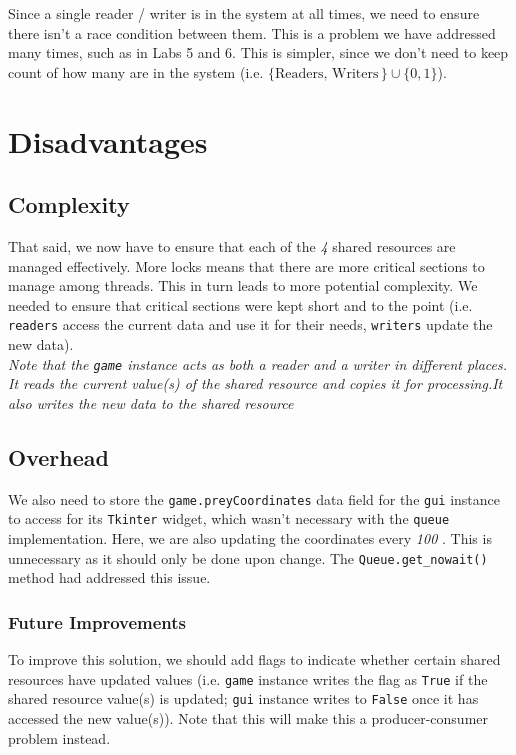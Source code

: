 \documentclass{article}
\begin{document}
Since a single reader / writer is in the system at all times, we need to ensure there isn't a race condition between them. This is a problem we have addressed many times, such as in
Labs 5 and 6. This is simpler, since we don't need to keep count of how many are in the system (i.e. \( \{ \text{Readers, Writers}\, \} \cup \{ 0, 1 \} \)).

\section{Disadvantages}

\subsection{Complexity}

That said, we now have to ensure that each of the \textit{4} shared resources are managed effectively. More locks means that there are more critical sections to manage among threads.
This in turn leads to more potential complexity. We needed to ensure that critical sections were kept short and to the point
(i.e. \texttt{readers} access the current data and use it for their needs, \texttt{writers} update the new data). \\

\textit{Note that the \texttt{game} instance acts as both a reader and a writer in different places. It reads the current value(s) of the shared resource and copies it for processing.It also writes the new data to the shared resource} \\

\subsection{Overhead}

We also need to store the \texttt{game.preyCoordinates} data field for the \texttt{gui} instance to access for its \texttt{Tkinter} widget, which wasn't necessary with the \texttt{queue} implementation.
Here, we are also updating the coordinates every \textit{100\,\,}. This is unnecessary as it should only be done upon change. The \texttt{Queue.get\_nowait()} method had addressed this issue.

\subsubsection{Future Improvements}

To improve this solution, we should add flags to indicate whether certain shared resources have updated values
(i.e. \texttt{game} instance writes the flag as \texttt{True} if the shared resource value(s) is updated; \texttt{gui} instance writes to \texttt{False} once it has accessed the new value(s)).
Note that this will make this a producer-consumer problem instead. \\
\end{document}
